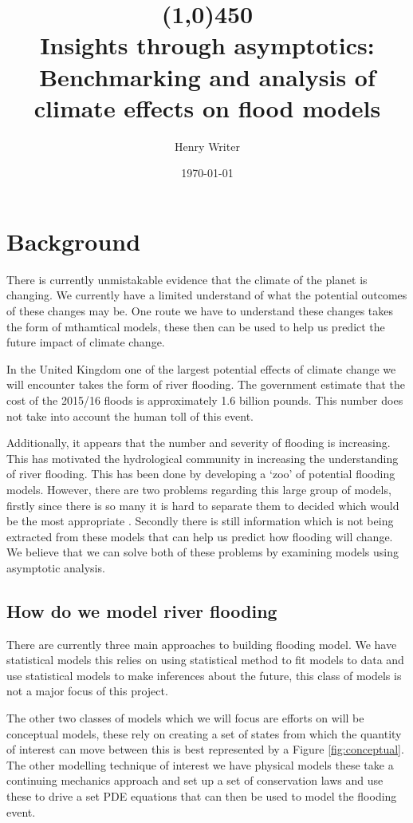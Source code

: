 \documentclass[11pt]{article}
\title{\line(1,0){450} \\ \Huge\textbf{Insights through asymptotics:}\\
 \LARGE Benchmarking and analysis of climate effects on flood models}
\author{Henry Writer }
\date{\monthyeardate\today}
\begin{document}
\maketitle

\section{Background}

There is currently unmistakable evidence that the climate of the planet is changing. We currently have a limited understand of what the potential outcomes of these changes may be. One route we have to understand these changes takes the form of mthamtical models, these then can be used to help us predict the future impact of climate change.

In the United Kingdom one of the largest potential effects of climate change we will encounter takes the form of river flooding. The government estimate that the cost of the 2015/16 floods is approximately 1.6 billion pounds. This number does not take into account the human toll of this event. 


Additionally, it appears that the number and severity of flooding is increasing. This has motivated the hydrological community in increasing the understanding of river flooding. This has been done by developing a `zoo' of potential flooding models. However, there are two problems regarding this large group of models, firstly since there is so many it is hard to separate them to decided which would be the most appropriate \cite{neelz2013benchmarking}. 
Secondly there is still information which is not being extracted from these models that can help us predict how flooding will change. We believe that we can solve both of these problems by examining models using asymptotic analysis.


\subsection{How do we model river flooding}
There are currently three main approaches to building flooding model. We have statistical models this relies on using statistical method to fit models to data and use statistical models to make inferences about the future, this class of models is not a major focus of this project. 

The other two classes of models which we will focus are efforts on will be conceptual models, these rely on creating a set of states from which the quantity of interest can move between this is best represented by a Figure \ref{fig:conceptual}. 
The other modelling technique of interest we have physical models these take a continuing mechanics approach and set up a set of conservation laws and use these to drive a set PDE equations that can then be used to model the flooding event.
\end{document}
